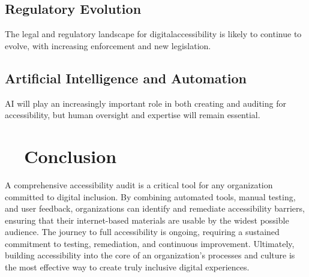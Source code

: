 \subsection{Regulatory Evolution}
\label{subsec:regulatory-evolution}
The legal and regulatory landscape for \gls{digitalaccessibility} is likely to continue to evolve, with increasing enforcement and new legislation.
\supercite{WCAG3Draft}

\subsection{Artificial Intelligence and Automation}
\label{subsec:ai-automation}
AI will play an increasingly important role in both creating and auditing for accessibility, but human oversight and expertise will remain essential.
\supercite{MicrosoftAIAccessibility, GoogleMLAccessibility}

\section{~~Conclusion}
\label{sec:conclusion-auditing}
A comprehensive accessibility audit is a critical tool for any organization committed to digital inclusion. By combining automated tools, manual testing, and user feedback, organizations can identify and remediate accessibility barriers, ensuring that their internet-based materials are usable by the widest possible audience. The journey to full accessibility is ongoing, requiring a sustained commitment to testing, remediation, and continuous improvement. Ultimately, building accessibility into the core of an organization's processes and culture is the most effective way to create truly inclusive digital experiences.
\supercite{Thatcher2006}
